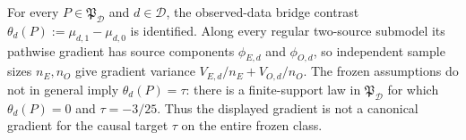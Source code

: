 For every \(P\in\mathfrak P_{\mathcal D}\) and \(d\in\mathcal D\), the observed-data bridge contrast \(\theta_d(P):=\mu_{d,1}-\mu_{d,0}\) is identified.  Along every regular two-source submodel its pathwise gradient has source components \(\phi_{E,d}\) and \(\phi_{O,d}\), so independent sample sizes \(n_E,n_O\) give gradient variance \(V_{E,d}/n_E+V_{O,d}/n_O\).  The frozen assumptions do not in general imply \(\theta_d(P)=\tau\): there is a finite-support law in \(\mathfrak P_{\mathcal D}\) for which \(\theta_d(P)=0\) and \(\tau=-3/25\).  Thus the displayed gradient is not a canonical gradient for the causal target \(\tau\) on the entire frozen class.